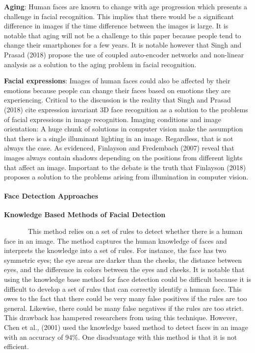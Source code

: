 \documentclass[
  12pt,
]{article}
\begin{document}
\textbf{Aging}: Human faces are known to change with age progression
which presents a challenge in facial recognition. This implies that
there would be a significant difference in images if the time difference
between the images is large. It is notable that aging will not be a
challenge to this paper because people tend to change their smartphones
for a few years. It is notable however that Singh and Prasad (2018)
propose the use of coupled auto-encoder networks and non-linear analysis
as a solution to the aging problem in facial recognition.

\textbf{Facial expressions}: Images of human faces could also be
affected by their emotions because people can change their faces based
on emotions they are experiencing. Critical to the discussion is the
reality that Singh and Prasad (2018) cite expression invariant 3D face
recognition as a solution to the problems of facial expressions in image
recognition. Imaging conditions and image orientation: A huge chunk of
solutions in computer vision make the assumption that there is a single
illuminant lighting in an image. Regardless, that is not always the
case. As evidenced, Finlayson and Fredembach (2007) reveal that images
always contain shadows depending on the positions from different lights
that affect an image. Important to the debate is the truth that
Finlayson (2018) proposes a solution to the problems arising from
illumination in computer vision.

\paragraph{\texorpdfstring{Face Detection Approaches\\
}{Face Detection Approaches }}\label{face-detection-approaches}

\textbf{Knowledge Based Methods of Facial Detection}\\
\vspace{-1.2em}

~~~~~~~This method relies on a set of rules to detect whether there is a
human face in an image. The method captures the human knowledge of faces
and interprets the knowledge into a set of rules. For instance, the face
has two symmetric eyes; the eye areas are darker than the cheeks, the
distance between eyes, and the difference in colors between the eyes and
cheeks. It is notable that using the knowledge base method for face
detection could be difficult because it is difficult to develop a set of
rules that can correctly identify a human face. This owes to the fact
that there could be very many false positives if the rules are too
general. Likewise, there could be many false negatives if the rules are
too strict. This drawback has hampered researchers from using this
technique. However, Chen et al., (2001) used the knowledge based method
to detect faces in an image with an accuracy of 94\%. One disadvantage
with this method is that it is not efficient.
\end{document}
